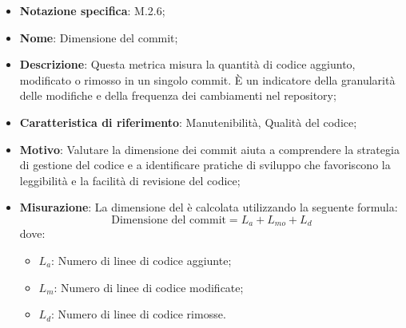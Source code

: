 \begin{itemize}
    \item \textbf{Notazione specifica}: M.2.6;
    \item \textbf{Nome}: Dimensione del commit;
    \item \textbf{Descrizione}: Questa metrica misura la quantità di codice aggiunto, modificato o rimosso in un singolo commit. È un indicatore della granularità delle modifiche e della frequenza dei cambiamenti nel repository;
    \item \textbf{Caratteristica di riferimento}: Manutenibilità, Qualità del codice;
    \item \textbf{Motivo}: Valutare la dimensione dei commit aiuta a comprendere la strategia di gestione del codice e a identificare pratiche di sviluppo che favoriscono la leggibilità e la facilità di revisione del codice;
    \item \textbf{Misurazione}: La dimensione del  è calcolata utilizzando la seguente formula:
    \[
        \text{Dimensione del commit} =L_{a} + L_{mo} + L_{d}
    \]
    dove:
    \begin{itemize}
        \item $L_{a}$: Numero di linee di codice aggiunte;
        \item $L_{m}$: Numero di linee di codice modificate;
        \item $L_{d}$: Numero di linee di codice rimosse.
    \end{itemize}

\end{itemize}
